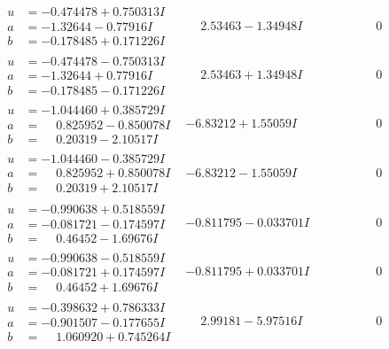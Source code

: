 \documentclass[1p]{elsarticle_modified}
\theoremstyle{definition}
\begin{document}
$$\begin{array}{c|c|c}
\begin{aligned}
u &= -0.474478 + 0.750313 I \\
a &= -1.32644 - 0.77916 I \\
b &= -0.178485 + 0.171226 I\end{aligned}
 & \phantom{-}2.53463 - 1.34948 I & \phantom{-0.000000 } 0 \\ \hline\begin{aligned}
u &= -0.474478 - 0.750313 I \\
a &= -1.32644 + 0.77916 I \\
b &= -0.178485 - 0.171226 I\end{aligned}
 & \phantom{-}2.53463 + 1.34948 I & \phantom{-0.000000 } 0 \\ \hline\begin{aligned}
u &= -1.044460 + 0.385729 I \\
a &= \phantom{-}0.825952 - 0.850078 I \\
b &= \phantom{-}0.20319 - 2.10517 I\end{aligned}
 & -6.83212 + 1.55059 I & \phantom{-0.000000 } 0 \\ \hline\begin{aligned}
u &= -1.044460 - 0.385729 I \\
a &= \phantom{-}0.825952 + 0.850078 I \\
b &= \phantom{-}0.20319 + 2.10517 I\end{aligned}
 & -6.83212 - 1.55059 I & \phantom{-0.000000 } 0 \\ \hline\begin{aligned}
u &= -0.990638 + 0.518559 I \\
a &= -0.081721 - 0.174597 I \\
b &= \phantom{-}0.46452 - 1.69676 I\end{aligned}
 & -0.811795 - 0.033701 I & \phantom{-0.000000 } 0 \\ \hline\begin{aligned}
u &= -0.990638 - 0.518559 I \\
a &= -0.081721 + 0.174597 I \\
b &= \phantom{-}0.46452 + 1.69676 I\end{aligned}
 & -0.811795 + 0.033701 I & \phantom{-0.000000 } 0 \\ \hline\begin{aligned}
u &= -0.398632 + 0.786333 I \\
a &= -0.901507 - 0.177655 I \\
b &= \phantom{-}1.060920 + 0.745264 I\end{aligned}
 & \phantom{-}2.99181 - 5.97516 I & \phantom{-0.000000 } 0 \\ \hline\begin{aligned}

\end{aligned}
\end{array}$$
\end{document}
